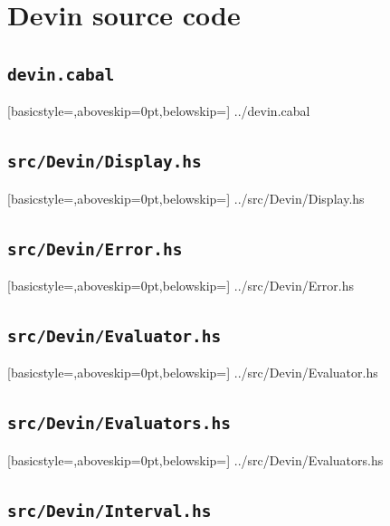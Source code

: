 \documentclass[UdineBachThesis,american,11pt]{PhdThesis}
\begin{document}
  \backmatter

  \appendix

  \chapter{Devin source code}
  \label{chapter:devin-source-code}

  \section{\texttt{devin.cabal}}

  
    [basicstyle=\ttfamily\footnotesize,aboveskip=0pt,belowskip=\baselineskip]
    {../devin.cabal}

  \section{\texttt{src/Devin/Display.hs}}

  
    [basicstyle=\ttfamily\footnotesize,aboveskip=0pt,belowskip=\baselineskip]
    {../src/Devin/Display.hs}

  \section{\texttt{src/Devin/Error.hs}}

  
    [basicstyle=\ttfamily\footnotesize,aboveskip=0pt,belowskip=\baselineskip]
    {../src/Devin/Error.hs}

  \section{\texttt{src/Devin/Evaluator.hs}}

  
    [basicstyle=\ttfamily\footnotesize,aboveskip=0pt,belowskip=\baselineskip]
    {../src/Devin/Evaluator.hs}

  \section{\texttt{src/Devin/Evaluators.hs}}

  
    [basicstyle=\ttfamily\footnotesize,aboveskip=0pt,belowskip=\baselineskip]
    {../src/Devin/Evaluators.hs}

  \section{\texttt{src/Devin/Interval.hs}}
\end{document}
